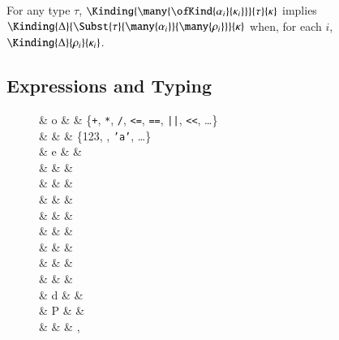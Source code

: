 \documentclass[9pt\ifFinal\else,preprint,nocopyrightspace\fi,\ifAlpha\else natbib,authoryear\fi]{sigplanconf}
\begin{document}
\begin{lemma} For any type $\tau$, $\Kinding{\many{\ofKind{\alpha_i}{\kappa_i}}}{\tau}{\kappa}$
      implies $\Kinding{\Delta}{\Subst{\tau}{\many{\alpha_i}}{\many{\rho_i}}}{\kappa}$ when, for each $i$, $\Kinding{\Delta}{\rho_i}{\kappa_i}$.
\end{lemma}

\subsection{Expressions and Typing}
\begin{figure}
\begin{grammar}
         & o              & \in       & \{\texttt{+}, \texttt{*}, \texttt{/}, \texttt{<=}, \texttt{==}, \texttt{||}, \texttt{{<}<}, \dots\} \\
        & \ell           & \in       & \{123, , \texttt{'a'}, \dots\} \\
     & e              & \Coloneqq &  \alt \Unit \alt {} \alt {} \alt {} \\
                       &                & \alt      &  \\
                       &                & \alt      &  \\
&                & \alt      &  \\
                       &                & \alt      & \ell \alt {} \alt {} \\
                       &                & \alt      &  \\
                       &                & \alt      &  \alt {} \\
                       &                & \alt      &  \alt {} \alt {} \\
                       &                & \alt      &  \\
   & d              & \Coloneqq &  \alt {} \\
        & P              & \Coloneqq & \\
  &                & \ni       & ,  \\

\end{grammar}
\end{figure}
\end{document}
